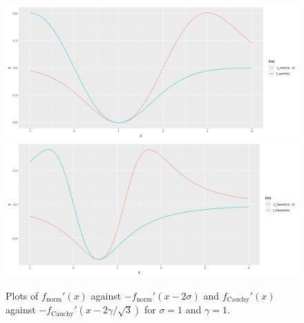		\begin{figure}
			\centering
			\includegraphics[width = \textwidth]{Figures/Mixtures/assumption6_normal.png}
			\includegraphics[width = \textwidth]{Figures/Mixtures/assumption6_cauchy.png}
			\caption{Plots of $f_\mathrm{norm}'(x)$ against $-f_\mathrm{norm}'(x - 2\sigma)$ and $f_\mathrm{Cauchy}'(x)$ against $-f_\mathrm{Cauchy}'(x - 2\gamma/\sqrt{3})$ for $\sigma = 1$ and $\gamma = 1$.}
			\label{fig:assumption6}
		\end{figure}



